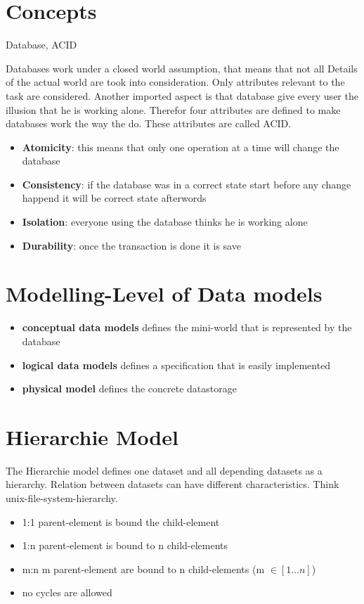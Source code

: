 \section{Concepts}
\begin{keywords}
Database, ACID
\end{keywords}
Databases work under a closed world assumption, that means that not all Details
of the actual world are took into consideration. Only attributes relevant to the
task are considered. Another imported aspect is that database give every user
the illusion that he is working alone. Therefor four attributes are defined to
make databases work the way the do. These attributes are called ACID.
\begin{itemize}
\setlength{\itemsep}{1pt}
	\item \textbf{Atomicity}: this means that only one operation at a time will change
the database
	\item \textbf{Consistency}: if the database was in a correct state start before 
any change happend it will be correct state afterwords
	\item \textbf{Isolation}: everyone using the database thinks he is working alone
	\item \textbf{Durability}: once the transaction is done it is save
\end{itemize}

\section{Modelling-Level of Data models}
\begin{itemize}
\setlength{\itemsep}{1pt}
	\item \textbf{conceptual data models} defines the mini-world that is
represented by the database
	\item \textbf{logical data models} defines a specification that is easily
implemented
	\item \textbf{physical model} defines the concrete datastorage
\end{itemize}

\section{Hierarchie Model}
The Hierarchie model defines one dataset and all depending datasets as a
hierarchy. Relation between datasets can have different characteristics.
Think unix-file-system-hierarchy.
\begin{itemize}
\setlength{\itemsep}{1pt}
	\item 1:1 parent-element is bound the child-element
	\item 1:n parent-element is bound to n child-elements
	\item m:n m parent-element are bound to n child-elements
(m $\in [1 \dots n]$)
	\item no cycles are allowed
\end{itemize}

